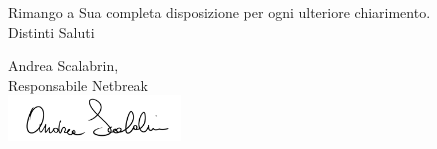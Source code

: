 \documentclass[11pt,a4paper]{letter}
\begin{document}
\begin{letter}
\noindent Rimango a Sua completa disposizione per ogni ulteriore chiarimento.\\
Distinti Saluti
	

\closing{Andrea Scalabrin,\\ Responsabile Netbreak\\ \includegraphics[width=1.8in]{AS.png}}


\end{letter}
\end{document}
